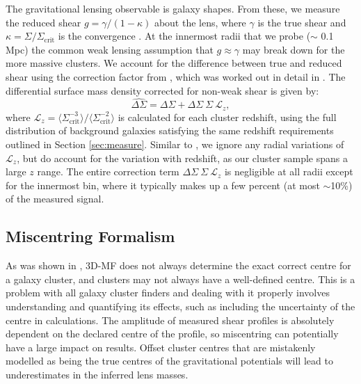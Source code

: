 The gravitational lensing observable is galaxy shapes. From these, we measure the reduced shear $g = \gamma / (1-\kappa)$ about the lens, where $\gamma$ is the true shear and $\kappa = \Sigma / \Sigma_{\mathrm{crit}}$ is the convergence \citep[as before, calculated using the \ac{NFW} halo formalism in][]{Wright00}. At the innermost radii that we probe ($\sim$ 0.1 \ac{Mpc}) the common weak lensing assumption that $g \approx \gamma$ may break down for the more massive clusters. We account for the difference between true and reduced shear using the correction factor from \citet{Johnston07}, which was worked out in detail in \citet{Mandelbaum06}. The differential surface mass density corrected for non-weak shear is given by:
\begin{equation}
\widehat{\Delta\Sigma} = \Delta\Sigma + \Delta\Sigma \ \Sigma \ \mathcal{L}_z,
\end{equation}
where $\mathcal{L}_z = \langle \Sigma_{\mathrm{crit}}^{-3} \rangle / \langle \Sigma_{\mathrm{crit}}^{-2} \rangle$ is calculated for each cluster redshift, using the full distribution of background galaxies satisfying the same redshift requirements outlined in Section \ref{sec:measure}. Similar to \citet{Leauthaud10}, we ignore any radial variations of $\mathcal{L}_z$, but do account for the variation with redshift, as our cluster sample spans a large $z$ range. The entire correction term $\Delta\Sigma \ \Sigma \ \mathcal{L}_z$ is negligible at all radii except for the innermost bin, where it typically makes up a few percent (at most $\sim$10\%) of the measured signal.


\subsection{Miscentring Formalism}
\label{sec:miscentring}

As was shown in \citet{Milkeraitis10}, \ac{3D-MF} does not always determine the exact correct centre for a galaxy cluster, and clusters may not always have a well-defined centre. This is a problem with all galaxy cluster finders and dealing with it properly involves understanding and quantifying its effects, such as including the uncertainty of the centre in calculations. The amplitude of measured shear profiles is absolutely dependent on the declared centre of the profile, so miscentring can potentially have a large impact on results. Offset cluster centres that are mistakenly modelled as being the true centres of the gravitational potentials will lead to underestimates in the inferred lens masses.

